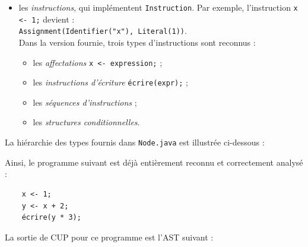 \documentclass[correction]{td}
\begin{document}
\begin{exercice}
\begin{itemize}
  \item les \emph{instructions}, qui implémentent \lstinline|Instruction|.
    Par exemple, l'instruction \lstinline|x <- 1;| devient :\\
    \hspace*{1cm}\lstinline|Assignment(Identifier("x"), Literal(1))|.\\[1mm]
    Dans la version fournie, trois types d'instructions sont reconnus :
    \begin{itemize}
    \item les \emph{affectations} \lstinline|x <- expression;| ;
    \item les \emph{instructions d'écriture} \lstinline|écrire(expr);| ;
    \item les \emph{séquences d'instructions} ;
    \item les \emph{structures conditionnelles}. 
    \end{itemize}

  \end{itemize}

  La hiérarchie des types fournis dans \lstinline|Node.java| est illustrée ci-dessous :

  \begin{center}
  \end{center}

  Ainsi, le programme suivant est déjà entièrement reconnu et correctement analysé :

  \begin{lstlisting}
    x <- 1;
    y <- x + 2;
    écrire(y * 3);
  \end{lstlisting}

  La sortie de CUP pour ce programme est l'AST suivant :


\end{exercice}
\end{document}
